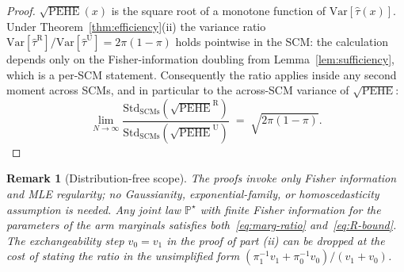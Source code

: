 \documentclass[11pt]{article}
\newtheorem{remark}[theorem]{Remark}
\newcommand{\PP}{\mathbb{P}}
\newcommand{\Var}{\mathrm{Var}}
\begin{document}
\begin{proof}
$\sqrt{\mathrm{PEHE}}(x)$ is the square root of a monotone function of
$\Var[\hat{\tau}(x)]$. Under Theorem~\ref{thm:efficiency}(ii) the
variance ratio $\Var[\hat{\tau}^{\mathrm{R}}] / \Var[\hat{\tau}^{\mathrm{U}}]
= 2\pi(1 - \pi)$ holds pointwise in the SCM: the calculation depends
only on the Fisher-information doubling from Lemma~\ref{lem:sufficiency},
which is a per-SCM statement. Consequently the ratio applies inside
any second moment across SCMs, and in particular to the
across-SCM variance of $\sqrt{\mathrm{PEHE}}$:
\begin{equation*}
  \lim_{N \to \infty}
    \frac{\mathrm{Std}_{\mathrm{SCMs}}(\sqrt{\mathrm{PEHE}}^{\mathrm{R}})}
         {\mathrm{Std}_{\mathrm{SCMs}}(\sqrt{\mathrm{PEHE}}^{\mathrm{U}})}
  \;=\;
  \sqrt{2\pi(1 - \pi)}.
\end{equation*}
\end{proof}

\begin{remark}[Distribution-free scope]
The proofs invoke only Fisher information and MLE regularity; no
Gaussianity, exponential-family, or homoscedasticity assumption is
needed. Any joint law $\PP^{\star}$ with finite Fisher information for
the parameters of the arm marginals satisfies both~\eqref{eq:marg-ratio}
and~\eqref{eq:R-bound}. The exchangeability step $v_{0} = v_{1}$ in
the proof of part (ii) can be dropped at the cost of stating the ratio
in the unsimplified form $(\pi_{1}^{-1} v_{1} + \pi_{0}^{-1}
v_{0})/(v_{1} + v_{0})$.
\end{remark}

\end{document}
